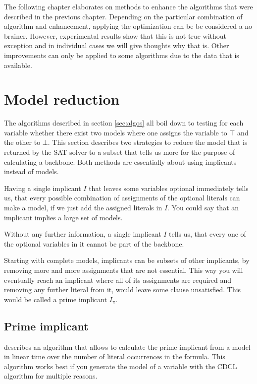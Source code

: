 
The following chapter elaborates on methods to enhance the algorithms that were described in the previous chapter. Depending on the particular combination of algorithm and enhancement, applying the optimization can be be considered a no brainer. However, experimental results show that this is not true without exception and in individual cases we will give thoughts why that is. Other improvements can only be applied to some algorithms due to the data that is available.

\section{Model reduction}

The algorithms described in section \ref{sec:algos} all boil down to testing for each variable whether there exist two models where one assigns the variable to $\top$ and the other to $\bot$. This section describes two strategies to reduce the model that is returned by the SAT solver to a subset that tells us more for the purpose of calculating a backbone. Both methods are essentially about using implicants instead of models.

Having a single implicant $I$ that leaves some variables optional immediately tells us, that every possible combination of assignments of the optional literals can make a model, if we just add the assigned literals in $I$. You could say that an implicant implies a large set of models.

Without any further information, a single implicant $I$ tells us, that every one of the optional variables in it cannot be part of the backbone.

Starting with complete models, implicants can be subsets of other implicants, by removing more and more assignments that are not essential. This way you will eventually reach an implicant where all of its assignments are required and removing any further literal from it, would leave some clause unsatisfied. This would be called a prime implicant $I_\pi$.

\subsection{Prime implicant}
\label{ss:primeImplicant}
\cite{dflbm13} describes an algorithm that allows to calculate the prime implicant from a model in linear time over the number of literal occurrences in the formula. This algorithm works best if you generate the model of a variable with the CDCL algorithm for multiple reasons.


